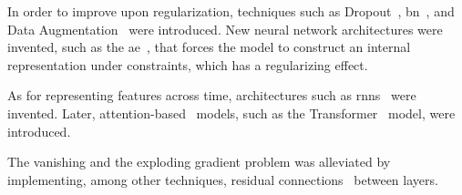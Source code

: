 \par
In order to improve upon regularization, techniques such as Dropout~\cite{dropout}, \gls*{bn}~\cite{batchnorm}, and Data Augmentation~\cite{data_augmentation} were introduced. New neural network architectures were invented, such as the \gls*{ae}~\cite{autoencoder}, that forces the model to construct an internal representation under constraints, which has a regularizing effect.
\par
As for representing features across time, architectures such as \glspl*{rnn}~\cite{lstm,gru} were invented. Later, attention-based~\cite{attention} models, such as the Transformer~\cite{transformer} model, were introduced.\par
The vanishing and the exploding gradient problem was alleviated by implementing, among other techniques, residual connections~\cite{resnet} between layers.
